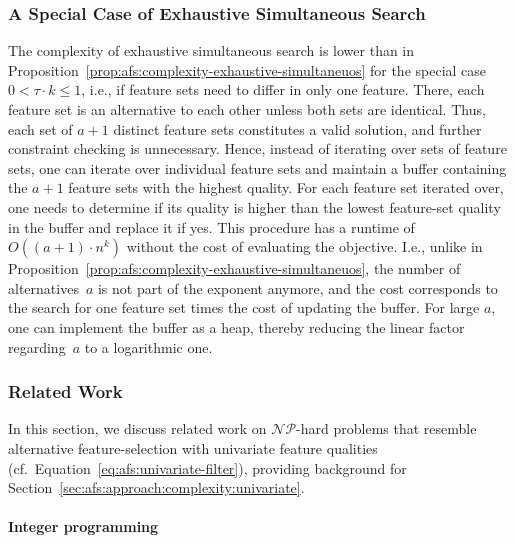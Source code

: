 \documentclass{article}
\theoremstyle{definition}
\begin{document}
\subsubsection{A Special Case of Exhaustive Simultaneous Search}
\label{sec:afs:appendix:complexity:exhaustive-simultaneous-special-case}

The complexity of exhaustive simultaneous search is lower than in Proposition~\ref{prop:afs:complexity-exhaustive-simultaneuos} for the special case~$0 < \tau \cdot k \leq 1$, i.e., if feature sets need to differ in only one feature.
There, each feature set is an alternative to each other unless both sets are identical.
Thus, each set of $a + 1$ distinct feature sets constitutes a valid solution, and further constraint checking is unnecessary.
Hence, instead of iterating over sets of feature sets, one can iterate over individual feature sets and maintain a buffer containing the $a + 1$ feature sets with the highest quality.
For each feature set iterated over, one needs to determine if its quality is higher than the lowest feature-set quality in the buffer and replace it if yes.
This procedure has a runtime of $O((a + 1) \cdot n^k)$ without the cost of evaluating the objective.
I.e., unlike in Proposition~\ref{prop:afs:complexity-exhaustive-simultaneuos}, the number of alternatives~$a$ is not part of the exponent anymore, and the cost corresponds to the search for one feature set times the cost of updating the buffer.
For large $a$, one can implement the buffer as a heap, thereby reducing the linear factor regarding~$a$ to a logarithmic one.

\subsubsection{Related Work}
\label{sec:afs:appendix:complexity:related-work}

In this section, we discuss related work on $\mathcal{NP}$-hard problems that resemble alternative feature-selection with univariate feature qualities (cf.~Equation~\ref{eq:afs:univariate-filter}), providing background for Section~\ref{sec:afs:approach:complexity:univariate}.

\paragraph{Integer programming}
\end{document}
